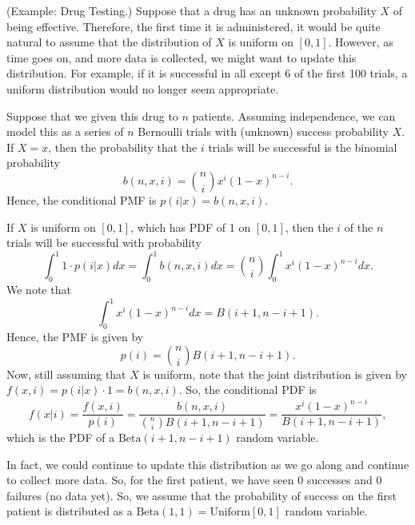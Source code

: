 \begin{mdframed}[]
    (Example: Drug Testing.) Suppose that a drug has an unknown probability $X$ of being effective. Therefore, the first time it is administered, it would be quite natural to assume that the distribution of $X$ is uniform on $[0, 1]$. However, as time goes on, and more data is collected, we might want to update this distribution. For example, if it is successful in all except 6 of the first 100 trials, a uniform distribution would no longer seem appropriate. 

    \bigskip 

    Suppose that we given this drug to $n$ patients. Assuming independence, we can model this as a series of $n$ Bernoulli trials with (unknown) success probability $X$. If $X = x$, then the probability that the $i$ trials will be successful is the binomial probability 
    \[b(n, x, i) = \binom{n}{i} x^i (1 - x)^{n - i}.\]
    Hence, the conditional PMF is $p(i | x) = b(n, x, i)$. 

    \bigskip 

    If $X$ is uniform on $[0, 1]$, which has PDF of 1 on $[0, 1]$, then the $i$ of the $n$ trials will be successful with probability
    \[\int_0^1 1 \cdot p(i | x) dx = \int_0^1 b(n, x, i)dx = \binom{n}{i} \int_0^1 x^i (1 - x)^{n - i} dx.\]
    We note that 
    \[\int_0^1 x^i (1 - x)^{n - i} dx = B(i + 1, n - i + 1).\]
    Hence, the PMF is given by 
    \[p(i) = \binom{n}{i} B(i + 1, n - i + 1).\]
    Now, still assuming that $X$ is uniform, note that the joint distribution is given by $f(x, i) = p(i | x) \cdot 1 = b(n, x, i)$. So, the conditional PDF is 
    \[f(x | i) = \frac{f(x, i)}{p(i)} = \frac{b(n, x, i)}{\binom{n}{i} B(i + 1, n - i + 1)} = \frac{x^i (1 - x)^{n - i}}{B(i + 1, n - i + 1)},\]
    which is the PDF of a $\text{Beta}(i + 1, n - i + 1)$ random variable.

    \bigskip 

    In fact, we could continue to update this distribution as we go along and continue to collect more data. So, for the first patient, we have seen 0 successes and 0 failures (no data yet). So, we assume that the probability of success on the first patient is distributed as a $\text{Beta}(1, 1) = \text{Uniform}[0, 1]$ random variable. 
\end{mdframed}
